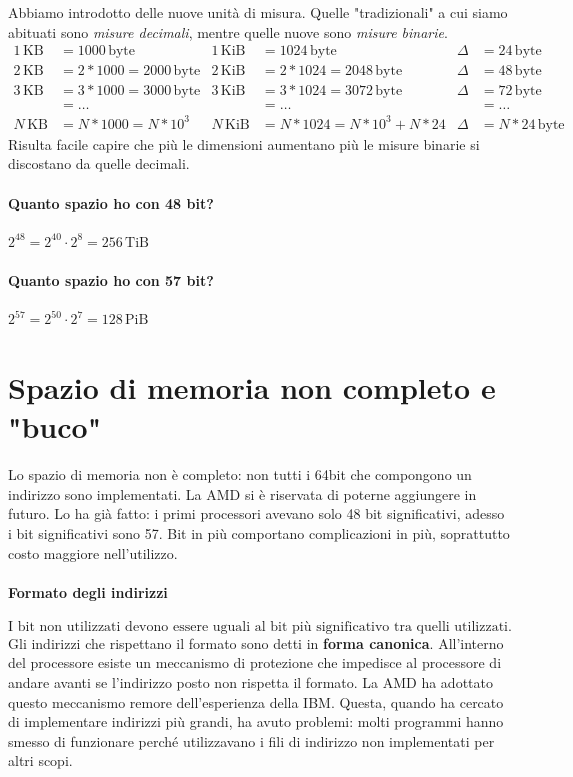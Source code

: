 \documentclass[11pt]{report}
\theoremstyle{definition}
\begin{document}
\noindent Abbiamo introdotto delle nuove unità di misura. Quelle "tradizionali" a cui siamo abituati sono \emph{misure decimali}, mentre quelle nuove sono \emph{misure binarie}. 
\begin{align*} 
1\,\text{KB}&=1000\,\text{byte}&1\,\text{KiB}&=1024\,\text{byte}&\Delta&=24\,\text{byte}\\
2\,\text{KB}&=2*1000=2000\,\text{byte}&2\,\text{KiB}&=2*1024=2048\,\text{byte}&\Delta&=48\,\text{byte}\\
3\,\text{KB}&=3*1000=3000\,\text{byte}&3\,\text{KiB}&=3*1024=3072\,\text{byte}&\Delta&=72\,\text{byte}\\
&=\dots&&=\dots&&=\dots\\
N\,\text{KB}&=N*1000=N*{10}^3&N\,\text{KiB}&=N*1024=N*{10}^3+N*24&\Delta&=N*24\,\text{byte}
\end{align*}
Risulta facile capire che più le dimensioni aumentano più le misure binarie si discostano da quelle decimali.

\paragraph{Quanto spazio ho con 48 bit?} $2^{48}=2^{40} \cdot 2^{8}= 256\,\text{TiB}$
\paragraph{Quanto spazio ho con 57 bit?} $2^{57}=2^{50} \cdot 2^{7}= 128\,\text{PiB}$

\section{Spazio di memoria non completo e "buco"} Lo spazio di memoria non è completo: non tutti i 64bit che compongono un indirizzo sono implementati. La AMD si è riservata di poterne aggiungere in futuro. Lo ha già fatto: i primi processori avevano solo 48 bit significativi, adesso i bit significativi sono 57. Bit in più comportano complicazioni in più, soprattutto costo maggiore nell'utilizzo.
\paragraph{Formato degli indirizzi} \[\boxed{\text{I bit non utilizzati devono essere uguali al bit più significativo tra quelli utilizzati.}}\]Gli indirizzi che rispettano il formato sono detti in \textbf{forma canonica}. All'interno del processore esiste un meccanismo di protezione che impedisce al processore di andare avanti se l'indirizzo posto non rispetta il formato. La AMD ha adottato questo meccanismo remore dell'esperienza della IBM. Questa, quando ha cercato di implementare indirizzi più grandi, ha avuto problemi: molti programmi hanno smesso di funzionare perché utilizzavano i fili di indirizzo non implementati per altri scopi.
\end{document}
